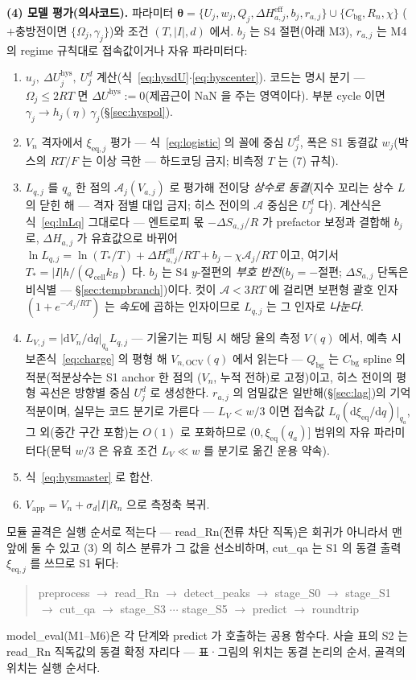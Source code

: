 \documentclass[11pt,a4paper]{article}
\newcommand{\dd}{\mathrm{d}}
\newcommand{\eff}{\mathrm{eff}}
\newcommand{\eq}{\mathrm{eq}}
\newcommand{\app}{\mathrm{app}}
\newcommand{\cell}{\mathrm{cell}}
\newcommand{\bg}{\mathrm{bg}}
\newcommand{\OCV}{\mathrm{OCV}}
\newcommand{\hys}{\mathrm{hys}}
\begin{document}
\textbf{(4) 모델 평가(의사코드).} 파라미터
$\bm\theta=\{U_j,w_j,Q_j,\Delta H_{a,j}^{\eff},b_j,r_{a,j}\}\cup\{C_\bg,R_n,\chi\}$
($+$충방전이면 $\{\Omega_j,\gamma_j\}$)와 조건 $(T,|I|,d)$ 에서. $b_j$ 는 S4 절편(아래 M3),
$r_{a,j}$ 는 M4 의 regime 규칙대로 접속값이거나 자유 파라미터다:
\begin{enumerate}[label=\textbf{M\arabic*.},leftmargin=2.4em,itemsep=1pt]
\item $u_j,\ \Delta U_j^\hys,\ U_j^d$ 계산(식~\eqref{eq:hysdU}$\cdot$\eqref{eq:hyscenter}).
  코드는 명시 분기 — $\Omega_j\le2RT$ 면 $\Delta U^\hys:=0$(제곱근이 NaN 을 주는 영역이다).
  부분 cycle 이면 $\gamma_j\to h_j(\eta)\,\gamma_j$(\S\ref{sec:hyspol}).
\item $V_n$ 격자에서 $\xi_{\eq,j}$ 평가 — 식~\eqref{eq:logistic} 의 꼴에 중심 $U_j^d$, 폭은
  S1 동결값 $w_j$(박스의 $RT/F$ 는 이상 극한 — 하드코딩 금지; 비측정 $T$ 는 (7) 규칙).
\item $L_{q,j}$ 를 $q_a$ 한 점의 $\mathcal A_j(V_{a,j})$ 로 평가해 전이당 \emph{상수로 동결}(지수
  꼬리는 상수 $L$ 의 닫힌 해 — 격자 점별 대입 금지; 히스 전이의 $\mathcal A$ 중심은 $U_j^d$ 다).
  계산식은 식~\eqref{eq:lnLq} 그대로다 — 엔트로피 몫 $-\Delta S_{a,j}/R$ 가 prefactor 보정과
  결합해 $b_j$ 로, $\Delta H_{a,j}$ 가 유효값으로 바뀌어
  $\ln L_{q,j}=\ln(T_*/T)+\Delta H_{a,j}^{\eff}/RT+b_j-\chi\mathcal A_j/RT$ 이고, 여기서
  $T_*=|I|h/(Q_\cell k_B)$ 다. $b_j$ 는 S4 $y$-절편의 \emph{부호 반전}($b_j=-$절편;
  $\Delta S_{a,j}$ 단독은 비식별 — \S\ref{sec:tempbranch})이다. 컷이 $\mathcal A<3RT$ 에 걸리면
  보편형 괄호 인자 $(1+e^{-\mathcal A_j/RT})$ 는 \emph{속도}에 곱하는 인자이므로 $L_{q,j}$ 는
  그 인자로 \emph{나눈다}.
\item $L_{V,j}=|\dd V_n/\dd q|_{q_a}L_{q,j}$ — 기울기는 피팅 시 해당 율의 측정 $V(q)$ 에서, 예측 시
  보존식~\eqref{eq:charge} 의 평형 해 $V_{n,\OCV}(q)$ 에서 읽는다 — $Q_\bg$ 는 $C_\bg$ spline 의
  적분(적분상수는 S1 anchor 한 점의 ($V_n$, 누적 전하)로 고정)이고, 히스 전이의 평형 곡선은 방향별
  중심 $U_j^d$ 로 생성한다. $r_{a,j}$ 의 엄밀값은 일반해(\S\ref{sec:lag})의 기억
  적분이며, 실무는 코드 분기로 가른다 — $L_V<w/3$ 이면 접속값 $L_{q}(\dd\xi_{\eq}/\dd q)|_{q_a}$,
  그 외(중간 구간 포함)는 $O(1)$ 로 포화하므로 $(0,\xi_{\eq}(q_a)]$ 범위의 자유 파라미터다(문턱
  $w/3$ 은 유효 조건 $L_V\ll w$ 를 분기로 옮긴 운용 약속).
\item 식~\eqref{eq:hysmaster} 로 합산.
\item $V_\app=V_n+\sigma_d|I|R_n$ 으로 측정축 복귀.
\end{enumerate}
모듈 골격은 실행 순서로 적는다 — read\_Rn(전류 차단 직독)은 회귀가 아니라서 맨 앞에 둘 수 있고 (3)
의 히스 분류가 그 값을 선소비하며, cut\_qa 는 S1 의 동결 출력 $\xi_{\eq,j}$ 를 쓰므로 S1 뒤다:
\begin{quote}\ttfamily\footnotesize
preprocess $\to$ read\_Rn $\to$ detect\_peaks $\to$ stage\_S0 $\to$ stage\_S1\\
$\to$ cut\_qa $\to$ stage\_S3 $\cdots$ stage\_S5 $\to$ predict $\to$ roundtrip
\end{quote}
model\_eval(M1--M6)은 각 단계와 predict 가 호출하는 공용 함수다. 사슬 표의 S2 는 read\_Rn 직독값의
동결 확정 자리다 — 표·그림의 위치는 동결 논리의 순서, 골격의 위치는 실행 순서다.
\end{document}
